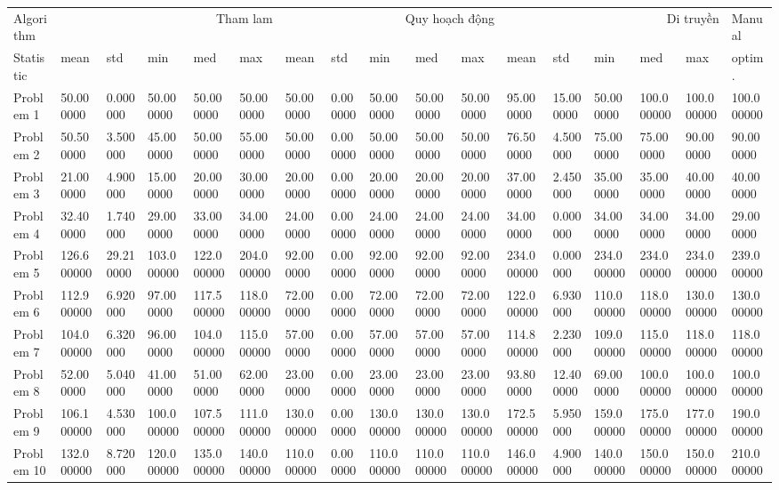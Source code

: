 \begin{tabular}{lllllllllllllllll}
\toprule
Algorithm & \multicolumn{5}{r}{Tham lam} & \multicolumn{5}{r}{Quy hoạch động} & \multicolumn{5}{r}{Di truyền} & Manual \\
Statistic & mean & std & min & med & max & mean & std & min & med & max & mean & std & min & med & max & optim. \\
\midrule
Problem 1 & 50.000000 & 0.000000 & 50.000000 & 50.000000 & 50.000000 & 50.000000 & 0.000000 & 50.000000 & 50.000000 & 50.000000 & 95.000000 & 15.000000 & 50.000000 & 100.000000 & 100.000000 & 100.000000 \\
Problem 2 & 50.500000 & 3.500000 & 45.000000 & 50.000000 & 55.000000 & 50.000000 & 0.000000 & 50.000000 & 50.000000 & 50.000000 & 76.500000 & 4.500000 & 75.000000 & 75.000000 & 90.000000 & 90.000000 \\
Problem 3 & 21.000000 & 4.900000 & 15.000000 & 20.000000 & 30.000000 & 20.000000 & 0.000000 & 20.000000 & 20.000000 & 20.000000 & 37.000000 & 2.450000 & 35.000000 & 35.000000 & 40.000000 & 40.000000 \\
Problem 4 & 32.400000 & 1.740000 & 29.000000 & 33.000000 & 34.000000 & 24.000000 & 0.000000 & 24.000000 & 24.000000 & 24.000000 & 34.000000 & 0.000000 & 34.000000 & 34.000000 & 34.000000 & 29.000000 \\
Problem 5 & 126.600000 & 29.210000 & 103.000000 & 122.000000 & 204.000000 & 92.000000 & 0.000000 & 92.000000 & 92.000000 & 92.000000 & 234.000000 & 0.000000 & 234.000000 & 234.000000 & 234.000000 & 239.000000 \\
Problem 6 & 112.900000 & 6.920000 & 97.000000 & 117.500000 & 118.000000 & 72.000000 & 0.000000 & 72.000000 & 72.000000 & 72.000000 & 122.000000 & 6.930000 & 110.000000 & 118.000000 & 130.000000 & 130.000000 \\
Problem 7 & 104.000000 & 6.320000 & 96.000000 & 104.000000 & 115.000000 & 57.000000 & 0.000000 & 57.000000 & 57.000000 & 57.000000 & 114.800000 & 2.230000 & 109.000000 & 115.000000 & 118.000000 & 118.000000 \\
Problem 8 & 52.000000 & 5.040000 & 41.000000 & 51.000000 & 62.000000 & 23.000000 & 0.000000 & 23.000000 & 23.000000 & 23.000000 & 93.800000 & 12.400000 & 69.000000 & 100.000000 & 100.000000 & 100.000000 \\
Problem 9 & 106.100000 & 4.530000 & 100.000000 & 107.500000 & 111.000000 & 130.000000 & 0.000000 & 130.000000 & 130.000000 & 130.000000 & 172.500000 & 5.950000 & 159.000000 & 175.000000 & 177.000000 & 190.000000 \\
Problem 10 & 132.000000 & 8.720000 & 120.000000 & 135.000000 & 140.000000 & 110.000000 & 0.000000 & 110.000000 & 110.000000 & 110.000000 & 146.000000 & 4.900000 & 140.000000 & 150.000000 & 150.000000 & 210.000000 \\
\bottomrule
\end{tabular}
